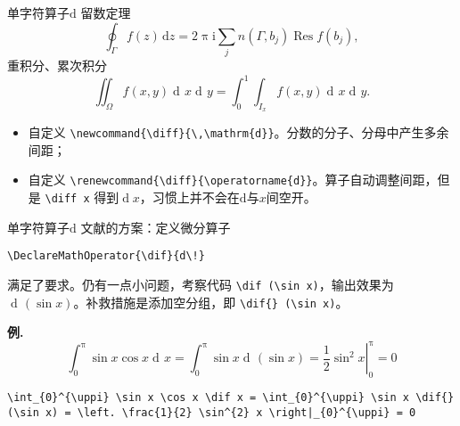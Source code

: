 \documentclass[mathserif]{beamer}
\newcommand{\codegreen}[1]{\textcolor{codegreen}{#1}}
\DeclareMathOperator{\dif}{d\!}
\newcommand{\mi}{\mathrm{i}}
\newcommand{\md}{\mathrm{d}}
\newenvironment{instance}{\zihao{-5}\textbf{\songti \codegreen{例.}}}{\hfill\par}
\begin{document}
\begin{frame}[fragile]{单字符算子}{$\mathrm{d}$}
留数定理
\begin{equation*}
	\oint_{\varGamma} f \left( z \right) \,\mathrm{d} z = 2 \uppi \mi \sum_{j} n \left( \varGamma, b_{j} \right) \operatorname{Res} f \left( b_{j} \right),
\end{equation*}
重积分、累次积分
\begin{equation*}
	\iint_{\varOmega} f \left( x, y \right) \dif x \dif y = \int_{0}^{1} \int_{I_{x}} f \left( x, y \right) \dif x \dif y.
\end{equation*}
\begin{itemize}

\item 自定义 \lstinline'\newcommand{\diff}{\,\mathrm{d}}'。分数的分子、分母中产生多余间距；

\item 自定义 \lstinline'\renewcommand{\diff}{\operatorname{d}}'。算子自动调整间距，但是 \lstinline'\diff x' 得到$\operatorname{d} x$，习惯上并不会在$\md$与$x$间空开。

\end{itemize}
\end{frame}

\begin{frame}[fragile]{单字符算子}{$\mathrm{d}$}
文献\cite{LaTeX入门}的方案：定义微分算子
\begin{lstlisting}[numbers=none]
	\DeclareMathOperator{\dif}{d\!}
\end{lstlisting}
满足了要求。仍有一点小问题，考察代码 \lstinline'\dif (\sin x)'，输出效果为$\dif (\sin x)$。补救措施是添加空分组，即 \lstinline'\dif{} (\sin x)'。

\begin{instance}
\begin{equation*}
	\int_{0}^{\uppi} \sin x \cos x \dif x = \int_{0}^{\uppi} \sin x \dif{} (\sin x) = \left. \frac{1}{2} \sin^{2} x \right|_{0}^{\uppi} = 0
\end{equation*}
\begin{lstlisting}[numbers=none]
	\int_{0}^{\uppi} \sin x \cos x \dif x = \int_{0}^{\uppi} \sin x \dif{} (\sin x) = \left. \frac{1}{2} \sin^{2} x \right|_{0}^{\uppi} = 0
\end{lstlisting}
\end{instance}
\end{frame}
\end{document}
